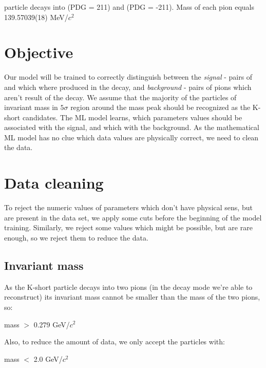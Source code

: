 \documentclass[11pt,a4paper]{article}
\begin{document}
\PKshort particle decays into \Pgpp (PDG = 211) and \Pgpm (PDG = -211). Mass of each pion equals 139.57039(18) MeV/$c^2$

\newpage
\section{Objective}
Our model will be trained to correctly distinguish between the \emph{signal} - pairs of \Pgpp and \Pgpm which where produced in the \KPshort decay, and \emph{background} - pairs of pions which aren't result of the \KPshort decay. We assume that the majority of the particles of invariant mass in $5 \sigma$ region around the \KPshort mass peak should be recognized as the K-short candidates. The ML model learns, which parameters values should be associated with the signal, and which with the background. As the mathematical ML model has no clue which data values are physically correct, we need to clean the data.
\section{Data cleaning}
To reject the numeric values of parameters which don't have physical sens, but are present in the data set, we apply some cuts before the beginning of the model training. Similarly, we reject some values which might be possible, but are rare enough, so we reject them to reduce the data.

\subsection{Invariant mass}
As the K-short particle decays into two pions (in the decay mode we're able to reconstruct) its invariant mass cannot be smaller than the mass of the two pions, so:
\begin{center}
    mass $>$ 0.279 GeV/$c^2$
\end{center}
Also, to reduce the amount of data, we only accept the particles with:
\begin{center}
    mass $<$ 2.0 GeV/$c^2$
\end{center}

\end{document}
